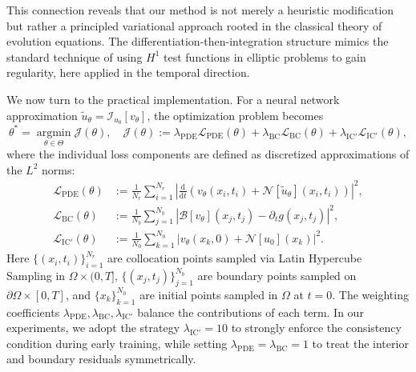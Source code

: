 \documentclass[11pt,reqno]{amsart}
\theoremstyle{plain}
\theoremstyle{definition}
\theoremstyle{remark}
\begin{document}
This connection reveals that our method is not merely a heuristic modification but rather a principled variational approach rooted in the classical theory of evolution equations. The differentiation-then-integration structure mimics the standard technique of using $H^1$ test functions in elliptic problems to gain regularity, here applied in the temporal direction.

We now turn to the practical implementation. For a neural network approximation $\tilde{u}_\theta = \mathcal{I}_{u_0}[v_\theta]$, the optimization problem becomes
\begin{equation}\label{eq:neural_objective}
    \theta^* = \operatorname*{argmin}_{\theta \in \Theta} \mathcal{J}(\theta), \quad \mathcal{J}(\theta) := \lambda_{\mathrm{PDE}} \mathcal{L}_{\mathrm{PDE}}(\theta) + \lambda_{\mathrm{BC}} \mathcal{L}_{\mathrm{BC}}(\theta) + \lambda_{\mathrm{IC}'} \mathcal{L}_{\mathrm{IC}'}(\theta),
\end{equation}
where the individual loss components are defined as discretized approximations of the $L^2$ norms:
\begin{align}
    \mathcal{L}_{\mathrm{PDE}}(\theta) &:= \frac{1}{N_r} \sum_{i=1}^{N_r} \left| \frac{\mathrm{d}}{\mathrm{d}t}\left( v_\theta(x_i, t_i) + \mathcal{N}[\tilde{u}_\theta](x_i, t_i) \right) \right|^2, \label{eq:loss_pde}\\
    \mathcal{L}_{\mathrm{BC}}(\theta) &:= \frac{1}{N_b} \sum_{j=1}^{N_b} \left| \mathcal{B}[v_\theta](x_j, t_j) - \partial_t g(x_j, t_j) \right|^2, \label{eq:loss_bc}\\
    \mathcal{L}_{\mathrm{IC}'}(\theta) &:= \frac{1}{N_0} \sum_{k=1}^{N_0} \left| v_\theta(x_k, 0) + \mathcal{N}[u_0](x_k) \right|^2. \label{eq:loss_ic}
\end{align}
Here $\{(x_i, t_i)\}_{i=1}^{N_r}$ are collocation points sampled via Latin Hypercube Sampling in $\Omega \times (0,T]$, $\{(x_j, t_j)\}_{j=1}^{N_b}$ are boundary points sampled on $\partial\Omega \times [0,T]$, and $\{x_k\}_{k=1}^{N_0}$ are initial points sampled in $\Omega$ at $t=0$. The weighting coefficients $\lambda_{\mathrm{PDE}}, \lambda_{\mathrm{BC}}, \lambda_{\mathrm{IC}'}$ balance the contributions of each term. In our experiments, we adopt the strategy $\lambda_{\mathrm{IC}'} = 10$ to strongly enforce the consistency condition during early training, while setting $\lambda_{\mathrm{PDE}} = \lambda_{\mathrm{BC}} = 1$ to treat the interior and boundary residuals symmetrically.
\end{document}
